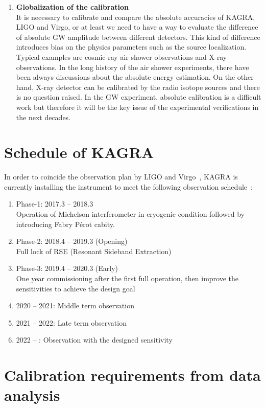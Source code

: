 \begin{enumerate}
\item {\bf Globalization of the calibration}\\
It is necessary to calibrate and compare the absolute accuracies of KAGRA, 
LIGO and Virgo, or at least we need to have a way to evaluate the difference 
of absolute GW amplitude between different detectors. This kind of difference 
introduces bias on the physics parameters such as the source localization. 
Typical examples are cosmic-ray air shower observations and X-ray 
observations. In the long history of the air shower experiments, 
there have been always discussions about the absolute energy estimation. 
On the other hand, X-ray detector can be calibrated by the radio isotope 
sources and there is no question raised. In the GW experiment, absolute 
calibration is a difficult work but therefore it will be the key issue of the 
experimental verifications in the next decades.

\end{enumerate}



\section{Schedule of KAGRA}

In order to coincide the observation plan by LIGO and Virgo~\cite{LV-obs},
KAGRA is currently installing the instrument to meet the following observation
schedule~\cite{KAGRA-obs}:

\begin{enumerate}
\item Phase-1: 2017.3 -- 2018.3\\
      Operation of Michelson interferometer in cryogenic condition 
      followed by introducing Fabry P\'{e}rot cabity.
\item Phase-2: 2018.4 -- 2019.3 (Opening)\\
      Full lock of RSE (Resonant Sideband Extraction)
\item Phase-3: 2019.4 -- 2020.3 (Early) \\
      One year commissioning after the first full operation, 
      then improve the sensitivities to achieve the design goal
\item 2020 -- 2021: Middle term observation
\item 2021 -- 2022: Late term observation
\item 2022 -- : Observation with the designed sensitivity

\end{enumerate}



\section{Calibration requirements from data analysis}


